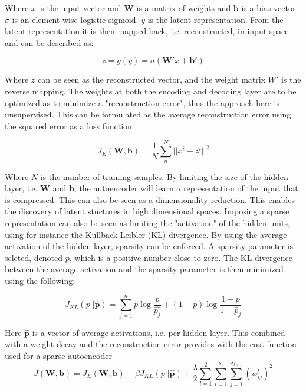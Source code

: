 \documentclass{article}
\begin{document}
Where $x$ is the input vector and $\mathbf{W}$ is a matrix of weights and $\mathbf{b}$ is a bias vector. $\sigma$ is an element-wise logistic sigmoid. $y$ is the latent representation. From the latent representation it is then mapped back, i.e. reconstructed, in input space and can be described as:

\begin{equation}
z = g(y) = \sigma(\mathbf{W'}x + \mathbf{b'})
\end{equation}

Where $z$ can be seen as the reconstructed vector, and the weight matrix $W'$ is the reverse mapping. The weights at both the encoding and decoding layer are to be optimized as to minimize a "reconstruction error", thus the approach here is unsupervised. This can be formulated as the average reconstruction error using the squared error as a loss function

\begin{equation}
J_E(\mathbf{W},\mathbf{b}) = \frac{1}{N} \sum_n^N || x^i - z^i || ^2
\end{equation}

Where $N$ is the number of training samples. By limiting the size of the hidden layer, i.e. $\mathbf{W}$ and $\mathbf{b}$, the autoencoder will learn a representation of the input that is compressed. This can also be seen as a dimensionality reduction. This enables the discovery of latent stuctures in high dimensional spaces. 
Imposing a sparse representation can also be seen as limiting the "activation" of the hidden units, using for instance the Kullback-Leibler (KL) divergence. By using the average activation of the hidden layer, sparsity can be enforced. A sparsity parameter is seleted, denoted $p$, which is a positive number close to zero. The KL divergence between the average activation and the sparsity parameter is then minimized using the following:

\begin{equation}
  J_{KL}(p || \hat{\mathbf{p}}) = \sum_{j=1}^n p \log\frac{p}{\hat{p_{j}}} + (1-p) \log\frac{1-p}{1-\hat{p}_j}
\end{equation}

Here $\hat{\mathbf{p}}$ is a vector of average activations, i.e. per hidden-layer. This combined with a weight decay and the reconstruction error provides with the cost function used for a sparse autoencoder \cite{Hosseini-Asl2016}
\begin{equation}
J(\mathbf{W},\mathbf{b}) = J_E(\mathbf{W},\mathbf{b}) + \beta J_{KL}(p || \hat{\mathbf{p}}) + \frac{\lambda}{2}\sum_{l=1}^2\sum_{i=1}^{s_l}\sum_{j=1}^{s_{l+1}} (w_{ij}^{l})^2
\end{equation}\label{eq:lossfunc}
\end{document}
